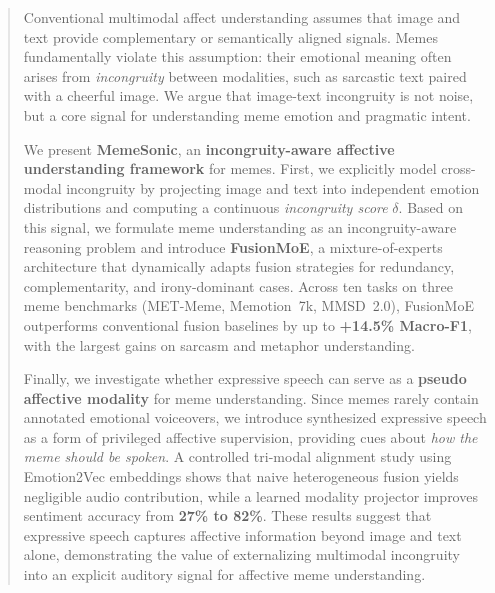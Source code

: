 \begin{abstract}
Conventional multimodal affect understanding assumes that image and text provide complementary or semantically aligned signals. Memes fundamentally violate this assumption: their emotional meaning often arises from \emph{incongruity} between modalities, such as sarcastic text paired with a cheerful image. We argue that image-text incongruity is not noise, but a core signal for understanding meme emotion and pragmatic intent.

We present \textbf{MemeSonic}, an \textbf{incongruity-aware affective understanding framework} for memes. First, we explicitly model cross-modal incongruity by projecting image and text into independent emotion distributions and computing a continuous \emph{incongruity score} $\delta$. Based on this signal, we formulate meme understanding as an incongruity-aware reasoning problem and introduce \textbf{FusionMoE}, a mixture-of-experts architecture that dynamically adapts fusion strategies for redundancy, complementarity, and irony-dominant cases. Across ten tasks on three meme benchmarks (MET-Meme, Memotion~7k, MMSD~2.0), FusionMoE outperforms conventional fusion baselines by up to \textbf{+14.5\% Macro-F1}, with the largest gains on sarcasm and metaphor understanding.

Finally, we investigate whether expressive speech can serve as a \textbf{pseudo affective modality} for meme understanding. Since memes rarely contain annotated emotional voiceovers, we introduce synthesized expressive speech as a form of privileged affective supervision, providing cues about \emph{how the meme should be spoken}. A controlled tri-modal alignment study using Emotion2Vec embeddings shows that naive heterogeneous fusion yields negligible audio contribution, while a learned modality projector improves sentiment accuracy from \textbf{27\% to 82\%}. These results suggest that expressive speech captures affective information beyond image and text alone, demonstrating the value of externalizing multimodal incongruity into an explicit auditory signal for affective meme understanding.
\end{abstract}